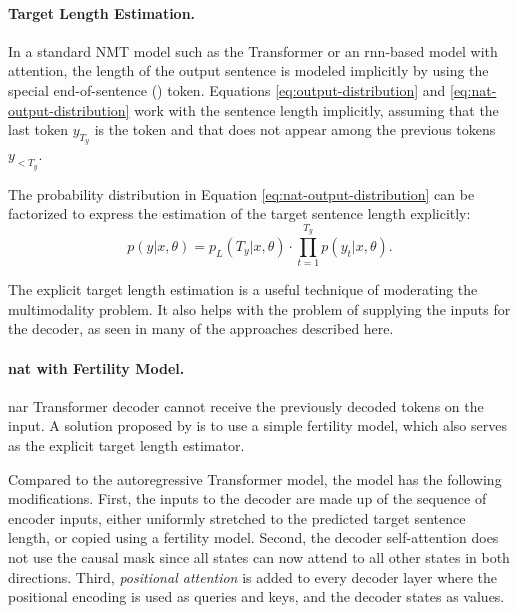 \paragraph{Target Length Estimation.} In a standard NMT model such as the
Transformer or an \acs{rnn}-based model with attention, the length of the
output sentence is modeled implicitly by using the special end-of-sentence
(\eos{}) token. Equations \ref{eq:output-distribution} and
\ref{eq:nat-output-distribution} work with the sentence length implicitly,
assuming that the last token $y_{T_y}$ is the \eos{} token and that \eos{} does
not appear among the previous tokens $y_{<T_y}$.

The probability distribution in Equation \ref{eq:nat-output-distribution} can
be factorized to express the estimation of the target sentence length
explicitly: %
\begin{equation}
  p(y|x, \theta) = p_L(T_y|x, \theta) \cdot \prod_{t=1}^{T_y}p(y_t|x,\theta).
  \label{eq:explicit-length}
\end{equation}

The explicit target length estimation is a useful technique of moderating the
multimodality problem. It also helps with the problem of supplying the inputs
for the decoder, as seen in many of the approaches described here.

\paragraph{\Ac{nat} with Fertility Model.} \Acs{nar} Transformer decoder cannot
receive the previously decoded tokens on the input. A solution proposed by
\citet{gu2017nonautoregressive} is to use a simple fertility model, which also
serves as the explicit target length estimator.

Compared to the autoregressive Transformer model, the model has the following
modifications. First, the inputs to the decoder are made up of the sequence of
encoder inputs, either uniformly stretched to the predicted target sentence
length, or copied using a fertility model. Second, the decoder self-attention
does not use the causal mask since all states can now attend to all other
states in both directions. Third, \emph{positional attention} is added to every
decoder layer where the positional encoding is used as queries and keys, and
the decoder states as values.

